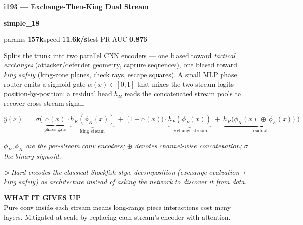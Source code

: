 \documentclass[10pt,a4paper]{article}
\newcommand{\pillsi}[0]{\colorbox{s18redbg}{\strut\textcolor{s18red}{\scriptsize\bfseries\sffamily simple\_18}}}
\begin{document}
\medskip

\begin{tcolorbox}
\begin{tcolorbox}[archhead, boxsep=0pt, top=4pt, bottom=4pt]
\textcolor{deepforest}{\sffamily\bfseries\large i193 --- Exchange-Then-King Dual Stream}\\[2pt]
\textcolor{muted}{\sffamily\scriptsize \pillsi{}\quad params \textbf{157k}\quad speed \textbf{11.6k/s}\quad test PR AUC \textbf{0.876}}
\end{tcolorbox}
\smallskip
Splits the trunk into two parallel CNN encoders --- one biased toward \emph{tactical exchanges} (attacker/defender geometry, capture sequences), one biased toward \emph{king safety} (king-zone planes, check rays, escape squares). A small MLP phase router emits a sigmoid gate $\alpha(x)\in[0,1]$ that mixes the two stream logits position-by-position; a residual head $h_R$ reads the concatenated stream pools to recover cross-stream signal.
\par\smallskip
\begin{equation*}
\hat{y}(x) \;=\; \sigma\!\bigl(\;\underbrace{\alpha(x)}_{\text{phase gate}} \cdot \underbrace{h_K(\phi_K(x))}_{\text{king stream}} \;+\; \bigl(1-\alpha(x)\bigr) \cdot \underbrace{h_E(\phi_E(x))}_{\text{exchange stream}} \;+\; \underbrace{h_R\!\bigl(\phi_K(x)\,\oplus\,\phi_E(x)\bigr)}_{\text{residual}}\;\bigr)
\end{equation*}
\par\vspace{-4pt}\begin{center}\textit{\textcolor{muted}{\small $\phi_E,\phi_K$ are the per-stream conv encoders; $\oplus$ denotes channel-wise concatenation; $\sigma$ the binary sigmoid.}}\end{center}
\par\smallskip
{\color{forest}\sffamily\bfseries\textgreater\,}\textit{Hard-encodes the classical Stockfish-style decomposition (\textit{exchange evaluation} + \textit{king safety}) as architecture instead of asking the network to discover it from data.}
\par\smallskip\textbf{\sffamily\footnotesize\color{muted}WHAT IT GIVES UP}\\
Pure conv inside each stream means long-range piece interactions cost many layers. Mitigated at scale by replacing each stream's encoder with attention.
\end{tcolorbox}
\end{document}
